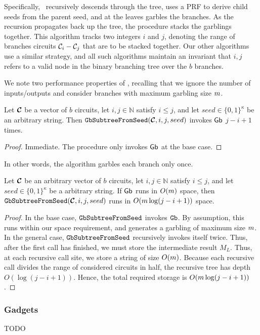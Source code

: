 Specifically, \gbtree\ recursively descends through the
tree, uses a PRF to derive child seeds from the parent seed, and at the
leaves garbles the branches.
As the recursion propagates back up the tree, the procedure stacks the
garblings together.
%
This algorithm tracks two integers $i$ and
$j$, denoting the range of branches circuits $\mathcal C_i - \mathcal C_j$ that are to
be stacked together.
Our other algorithms use a similar strategy, and all such algorithms
maintain an invariant that $i,j$ refers to a valid node in the binary
branching tree over the $b$ branches.


We note two performance properties of \gbtree, recalling that we ignore
the number of inputs/outputs and consider branches with maximum
garbling size $m$.
\begin{lemma}\label{lemma:gbtreetime}
  Let $\vec{\cir}$ be a vector of $b$ circuits,
  let $i, j \in \mathbb{N}$ satisfy $i \leq j$,
  and let $seed \in \{0, 1\}^\kappa$ be an arbitrary string.
  Then $\gbtree(\vec \cir, i, j, seed)$ invokes $\textsf{Gb}$ $j - i + 1$ times.
\end{lemma}
\begin{proof}
  Immediate. The procedure only invokes $\textsf{Gb}$ at the base case.
\end{proof}
In other words, the algorithm garbles each branch only once.

\begin{lemma}\label{lemma:gbtreespace}
  Let $\vec{\cir}$ be an arbitrary vector of $b$ circuits,
  let $i, j \in \mathbb{N}$ satisfy $i \leq j$,
  and let $seed \in \{0, 1\}^\kappa$ be a arbitrary string.
  If $\mathsf{Gb}$ runs in $O(m)$ space,
  then $\gbtree(\vec \cir, i, j, seed)$ runs in $O(m \log (j-i+1))$ space.
\end{lemma}
\begin{proof}
  In the base case, $\mathtt{GbSubtreeFromSeed}$ invokes $\mathtt{Gb}$. By assumption, this runs
  within our space requirement, and generates a garbling of maximum
  size $m$.
  In the general case, $\mathtt{GbSubtreeFromSeed}$ recursively invokes itself twice.
  Thus, after the first call has finished, we must store the
  intermediate result $M_L$.
  Thus, at each recursive call site, we store a string of size
  $O(m)$.
  Because each recursive call divides the range of considered circuits
  in half, the recursive tree has depth $O(\log(j-i+1))$.
  Hence, the total required storage is $O(m \log(j-i+1))$.
\end{proof}

\subsubsection{Gadgets}
TODO

